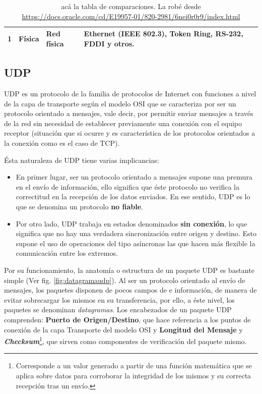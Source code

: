 \begin{table}[h!]
\begin{tabular}{|c|p{4cm}|l|p{5cm}|}
1                                                                                            & Física                                                                                           & Red física                                & Ethernet (IEEE 802.3), Token Ring, RS-232, FDDI y otros.                                              \\ \hline
\end{tabular}
\caption{acá la tabla de comparaciones. La robé desde \url{https://docs.oracle.com/cd/E19957-01/820-2981/6nei0r0r9/index.html}}
\label{tabla:tcpiposi}
\end{table}


\subsection{UDP}
UDP \cite{rfc:udp} es un protocolo de la familia de protocolos de Internet con funciones a nivel de la capa de transporte según el modelo OSI que se caracteriza por ser un protocolo orientado a mensajes, vale decir, por permitir enviar mensajes a través de la red sin necesidad de establecer previamente una conexión con el equipo receptor (situación que si ocurre y es característica de los protocolos orientados a la conexión como es el caso de TCP).

Ésta naturaleza de UDP tiene varias implicancias:
\begin{itemize}
\item En primer lugar, ser un protocolo orientado a mensajes supone una premura en el envío de información, ello significa que éste protocolo no verifica la correctitud en la recepción de los datos enviados. En ese sentido, UDP es lo que se denomina un protocolo \textbf{no fiable}.
\item Por otro lado, UDP trabaja en estados denominados \textbf{sin conexión}, lo que significa que no hay una verdadera sincronización entre origen y destino. Esto supone el uso de operaciones del tipo asíncronas las que hacen más flexible la comunicación entre los extremos.
\end{itemize}

Por su funcionamiento, la anatomía o estructura de un paquete UDP es bastante simple (Ver fig. \ref{fig:datagramaudp}). Al ser un protocolo orientado al envío de mensajes, los paquetes disponen de pocos campos de e información, de manera de evitar sobrecargar los mismos en su transferencia, por ello, a éste nivel, los paquetes se denominan \emph{datagramas}. Los encabezados de un paquete UDP comprenden: \textbf{Puerto de Origen/Destino}, que hace referencia a los puntos de conexión de la capa Transporte del modelo OSI y \textbf{Longitud del Mensaje} y \textbf{\emph{Checksum}}\footnote{Corresponde a un valor generado a partir de una función matemática que se aplica sobre datos para corroborar la integridad de los mismos y su correcta recepción tras un envío.}, que sirven como componentes de verificación del paquete mismo.

